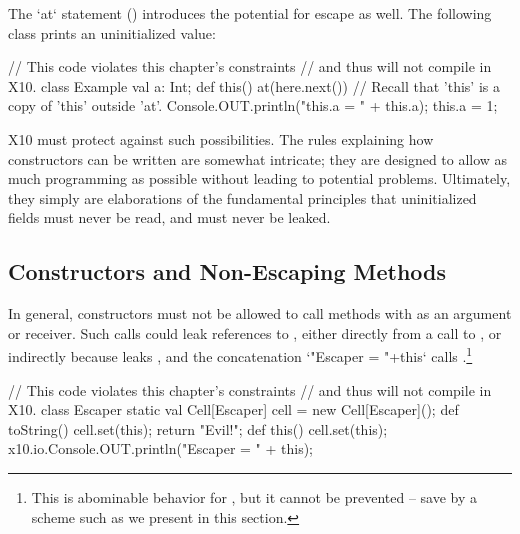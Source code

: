 The \xcd`at` statement () introduces the potential for
escape as well. The following class prints an uninitialized value: 
\begin{xten}
// This code violates this chapter's constraints
// and thus will not compile in X10.
class Example {
  val a: Int;
  def this() { 
    at(here.next()) {
      // Recall that 'this' is a copy of 'this' outside 'at'.
      Console.OUT.println("this.a = " + this.a);
    }
    this.a = 1;
  }
}
\end{xten}
%


X10 must protect against such possibilities.  The rules explaining how
constructors can be written are somewhat intricate; they are designed to allow
as much programming as possible without leading to potential problems.
Ultimately, they simply are elaborations of the fundamental principles that
uninitialized fields must never be read, and  must never be leaked.




\subsection{Constructors and Non-Escaping Methods}
\label{sect:nonescaping}

In general, constructors must not be allowed to call methods with  as
an argument or receiver. Such calls could leak references to ,
either directly from a call to , or indirectly because
 leaks , and the concatenation
\Xcd`"Escaper = "+this` calls .\footnote{This is abominable behavior for
, but it cannot be prevented -- save by a scheme such as we
present in this section.}
\begin{xten}
// This code violates this chapter's constraints
// and thus will not compile in X10.
class Escaper {
  static val Cell[Escaper] cell = new Cell[Escaper]();
  def toString() {
    cell.set(this);
    return "Evil!";
  }
  def this() {
    cell.set(this);
    x10.io.Console.OUT.println("Escaper = " + this);
  }
}
\end{xten}
%

